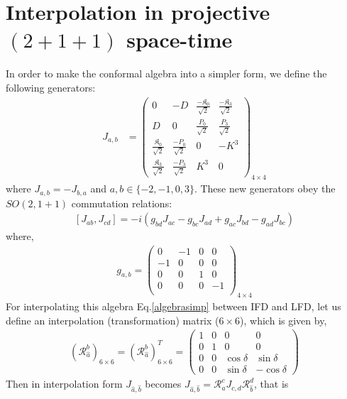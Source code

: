 \documentclass[]{article}
\numberwithin{equation}{section}
\begin{document}
{{\section{Interpolation in projective $(2+1+1)$ space-time}
In order to make the conformal algebra into a simpler form, we define the following generators:
\begin{align}\label{Jab}
  J_{a,b}&=
  \begin{pmatrix}
  0&-D&\frac{-\mathfrak{K}_0}{\sqrt{2}}&\frac{-\mathfrak{K}_3}{\sqrt{2}}\\
  D&0&\frac{P_0}{\sqrt{2}}&\frac{P_3}{\sqrt{2}}\\
    \frac{\mathfrak{K}_0}{\sqrt{2}}&\frac{-P_0}{\sqrt{2}}&0  & -K^{3}\\
    \frac{\mathfrak{K}_3}{\sqrt{2}}&\frac{-P_3}{\sqrt{2}}&K^{3} & 0
  \end{pmatrix}_{4\times4}
\end{align}
where $J_{a,b}=-J_{b,a}$ and $a,b\in\{-2,-1,0,3\}$. These new generators obey the $SO(2,1+1)$ commutation relations:
  \begin{align}\label{algebrasimp}
      \left[J_{{a}{b}},J_{{c}{d}}\right]=-i\left(g_{{b}{d}}J_{{a}{c}}-g_{{b}{c}}J_{{a}{d}}+g_{{a}{c}}J_{{b}{d}}-g_{{a}{d}}J_{{b}{c}}\right)
  \end{align}
where, 
  \begin{align}\label{metric}
      g_{a,b}=\begin{pmatrix}
  0&-1&0&0\\
  -1&0&0&0\\
  0&0&1&0\\
  0&0&0&-1\\
  \end{pmatrix}_{4\times4}
  \end{align}
For interpolating this algebra Eq.\eqref{algebrasimp} between IFD and LFD, let us define an interpolation (transformation) matrix ($6\times6$), which is given by,
\begin{align}
    (\mathcal{R}_{\hat{a}}^{b})_{6\times6}=(\mathcal{R}_{\hat{a}}^{b})^T_{6\times6}=\begin{pmatrix}
    1&0&0&0\\
    0&1&0&0\\
    0&0&\cos{\delta}&\sin{\delta}\\
    0&0&\sin{\delta}&-\cos{\delta}
    \end{pmatrix}
\end{align}
Then in interpolation form $J_{\hat{a},\hat{b}}$ becomes $J_{\hat{a},\hat{b}}=\mathcal{R}_{\hat{a}}^{{c}}J_{c,d}\mathcal{R}_{\hat{b}}^{{d}}$, that is
}}
\end{document}
